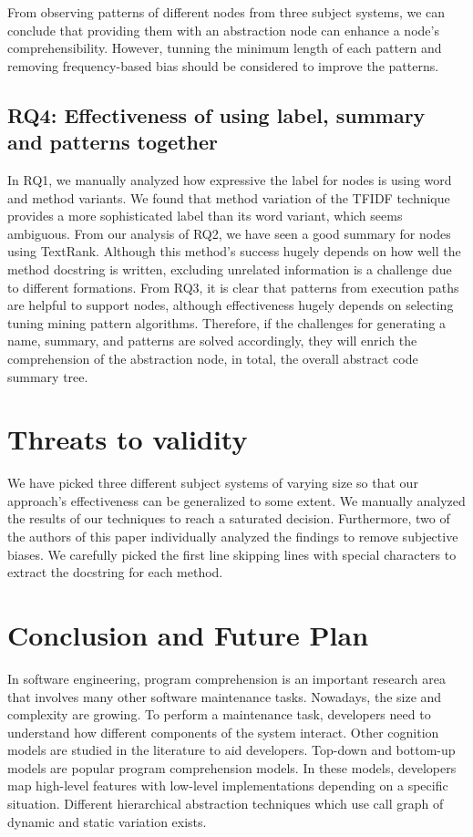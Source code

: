 From observing patterns of different nodes from three subject systems, we can conclude that providing them with an abstraction node can enhance a node's comprehensibility. However, tunning the minimum length of each pattern and removing frequency-based bias should be considered to improve the patterns.
\subsection{ RQ4: Effectiveness of using label, summary and patterns together}

In RQ1, we manually analyzed how expressive the label for nodes is using word and method variants. We found that method variation of the TFIDF technique provides a more sophisticated label than its word variant, which seems ambiguous. From our analysis of RQ2, we have seen a good summary for nodes using TextRank. Although this method's success hugely depends on how well the method docstring is written, excluding unrelated information is a challenge due to different formations. From RQ3, it is clear that patterns from execution paths are helpful to support nodes, although effectiveness hugely depends on selecting tuning mining pattern algorithms. Therefore, if the challenges for generating a name, summary, and patterns are solved accordingly, they will enrich the comprehension of the abstraction node, in total, the overall abstract code summary tree. 

\section{Threats to validity}

We have picked three different subject systems of varying size so that our approach's effectiveness can be generalized to some extent. We manually analyzed the results of our techniques to reach a saturated decision. Furthermore, two of the authors of this paper individually analyzed the findings to remove subjective biases. We carefully picked the first line skipping lines with special characters to extract the docstring for each method. 

\section{Conclusion and Future Plan}
In software engineering, program comprehension is an important research area that involves many other software maintenance tasks. Nowadays, the size and complexity are growing. To perform a maintenance task, developers need to understand how different components of the system interact. Other cognition models are studied in the literature to aid developers. Top-down and bottom-up models are popular program comprehension models. In these models, developers map high-level features with low-level implementations depending on a specific situation. Different hierarchical abstraction techniques which use call graph of dynamic and static variation exists. 

